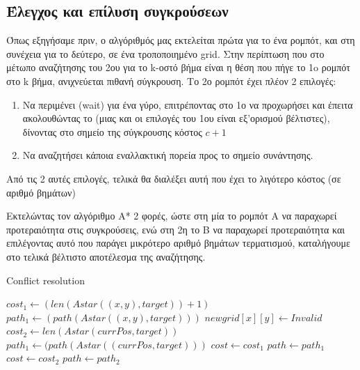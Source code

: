 \documentclass[a4paper,9pt]{article}
\begin{document}


\subsection{Έλεγχος και επίλυση συγκρούσεων}
Όπως εξηγήσαμε πριν, ο αλγόριθμός μας εκτελείται πρώτα για το ένα ρομπότ, και
στη συνέχεια για το δεύτερο, σε ένα τροποποιημένο grid. Στην περίπτωση που στο
μέτωπο αναζήτησης του 2ου για το k-οστό βήμα είναι η θέση που πήγε το 1o
ρομπότ στο k βήμα, ανιχνεύεται πιθανή σύγκρουση. Το 2ο ρομπότ έχει πλέον 2
επιλογές:
\begin{enumerate}
    \item Να περιμένει (wait) για ένα γύρο, επιτρέποντας στο 1ο να προχωρήσει
        και έπειτα ακολουθώντας το (μιας και οι επιλογές του 1ου είναι εξ'ορισμού
        βέλτιστες), δίνοντας στο σημείο της σύγκρουσης κόστος $c+1$
    \item Να αναζητήσει κάποια εναλλακτική πορεία προς το σημείο συνάντησης.
\end{enumerate}
Από τις 2 αυτές επιλογές, τελικά θα διαλέξει αυτή που έχει το λιγότερο κόστος
(σε αριθμό βημάτων)

Εκτελώντας τον αλγόριθμο A* 2 φορές, ώστε στη μία το ρομπότ A να παραχωρεί
προτεραιότητα στις συγκρούσεις, ενώ στη 2η το Β να παραχωρεί προτεραιότητα και
επιλέγοντας αυτό που παράγει μικρότερο αριθμό βημάτων τερματισμού, καταλήγουμε
στο τελικά βέλτιστο αποτέλεσμα της αναζήτησης.

\begin{algorithm}[H]
    \caption{Conflict resolution}
    \begin{algorithmic}[1]
        \State $cost_1 \gets (len(Astar((x,y), target)) + 1)$
        \State $path_1 \gets (path(Astar((x,y), target)))$
        \State $newgrid[x][y] \gets Invalid$
        \State $cost_2 \gets len(Astar(currPos, target))$
        \State $path_1 \gets (path(Astar((currPos, target)))$
        \State $cost \gets cost_1$
        \State $path \gets path_1$
        \Else
        \State $cost \gets cost_2$
        \State $path \gets path_2$
    \EndIf
\EndIf
\EndProcedure
\end{algorithmic}
\end{algorithm}


\pagebreak
\end{document}
